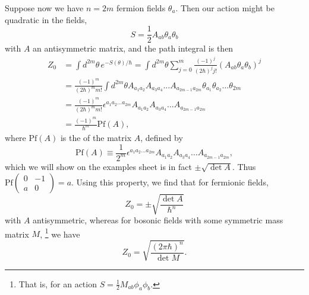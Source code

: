 Suppose now we have $n=2m$ fermion fields $\theta_a$. Then our action might be quadratic in the fields,
\begin{equation}
    S=\frac{1}{2} A_{ab} \theta_a \theta_b
\end{equation}
with $A$ an antisymmetric matrix, and the path integral is then
\begin{align*}
    Z_0 &= \int d^{2m}\theta\, e^{-S(\theta)/\hbar} = \int d^{2m} \theta \sum_{j=0}^{m} \frac{(-1)^j}{(2\hbar)^j j!} (A_{ab}\theta_a \theta_b)^j\\
    &= \frac{(-1)^m}{(2\hbar)^m m!} \int d^{2m}\theta A_{a_1 a_2} A_{a_3 a_4} \ldots A_{a_{2m-1} a_{2m}} \theta_{a_1} \theta_{a_2} \ldots \theta_{2m}\\
    &= \frac{(-1)^m}{(2\hbar)^m m!} \epsilon^{a_1 a_2 \ldots a_{2m}} A_{a_1 a_2} A_{a_3 a_4} \ldots A_{a_{2m-1} a_{2m}}\\
    &= \frac{(-1)^m}{\hbar^m} \text{Pf}(A),
\end{align*}
where $\text{Pf}(A)$ is the  of the matrix $A$, defined by
\begin{equation}
    \text{Pf}(A)\equiv \frac{1}{2^m} \epsilon^{a_1 a_2 \ldots a_{2m}} A_{a_1 a_2} A_{a_3 a_4} \ldots A_{a_{2m-1} a_{2m}},
\end{equation}
which we will show on the examples sheet is in fact $\pm \sqrt{\det A}.$ Thus $\text{Pf}\begin{pmatrix}0 & -1 \\ a & 0 \end{pmatrix} = a$. Using this property, we find that for fermionic fields,
\begin{equation}
    Z_0 = \pm \sqrt{\frac{\det A}{\hbar^n}}
\end{equation}
with $A$ antisymmetric, whereas for bosonic fields with some symmetric mass matrix $M$,%
    \footnote{That is, for an action $S=\frac{1}{2}M_{ab}\phi_a \phi_b$.}
we have
\begin{equation}
    Z_0=\sqrt{\frac{(2\pi \hbar)^n}{\det M}}.
\end{equation}

